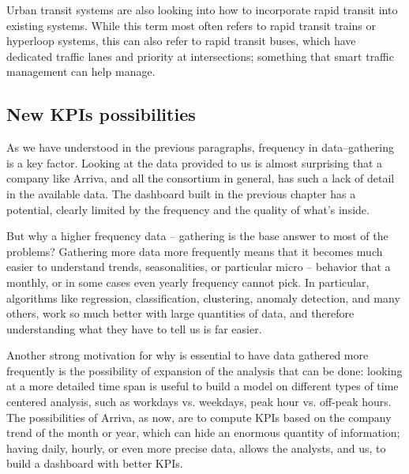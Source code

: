 Urban transit systems are also looking into how to incorporate rapid transit into existing systems. While this term most often refers to rapid transit trains or hyperloop systems, this can also refer to rapid transit buses, which have dedicated traffic lanes and priority at intersections; something that smart traffic management can help manage.


\subsection{New KPIs possibilities}
\label{subsec:newpossibilities}
As we have understood in the previous paragraphs, frequency in data–gathering is a key factor. Looking at the data provided to us is almost surprising that a company like Arriva, and all the consortium in general, has such a lack of detail in the available data. The dashboard built in the previous chapter has a potential, clearly limited by the frequency and the quality of what’s inside.

But why a higher frequency data – gathering is the base answer to most of the problems? Gathering more data more frequently means that it becomes much easier to understand trends, seasonalities, or particular micro – behavior that a monthly, or in some cases even yearly frequency cannot pick. In particular, algorithms like regression, classification, clustering, anomaly detection, and many others, work so much better with large quantities of data, and therefore understanding what they have to tell us is far easier.

Another strong motivation for why is essential to have data gathered more frequently is the possibility of expansion of the analysis that can be done: looking at a more detailed time span is useful to build a model on different types of time centered analysis, such as workdays vs. weekdays, peak hour vs. off-peak hours. The possibilities of Arriva, as now, are to compute KPIs based on the company trend of the month or year, which can hide an enormous quantity of information; having daily, hourly, or even more precise data, allows the analysts, and us, to build a dashboard with better KPIs.

